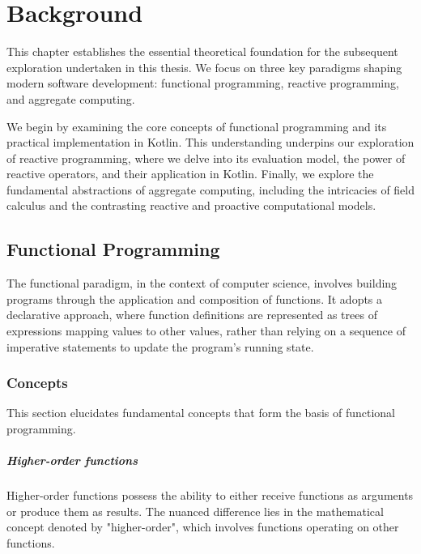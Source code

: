 
\chapter{Background}
\label{chap:background}

This chapter establishes the essential theoretical foundation for the subsequent exploration undertaken in this thesis. We focus on three key paradigms shaping modern software development: functional programming, reactive programming, and aggregate computing.

We begin by examining the core concepts of functional programming and its practical implementation in Kotlin. This understanding underpins our exploration of reactive programming, where we delve into its evaluation model, the power of reactive operators, and their application in Kotlin. Finally, we explore the fundamental abstractions of aggregate computing, including the intricacies of field calculus and the contrasting reactive and proactive computational models.

\section{Functional Programming}

The functional paradigm, in the context of computer science, involves building programs through the application and composition of functions. It adopts a declarative approach, where function definitions are represented as trees of expressions mapping values to other values, rather than relying on a sequence of imperative statements to update the program's running state.

\subsection{Concepts}

This section elucidates fundamental concepts that form the basis of functional programming.

\paragraph{Higher-order functions}

Higher-order functions possess the ability to either receive functions as arguments or produce them as results. The nuanced difference lies in the mathematical concept denoted by "higher-order", which involves functions operating on other functions.

